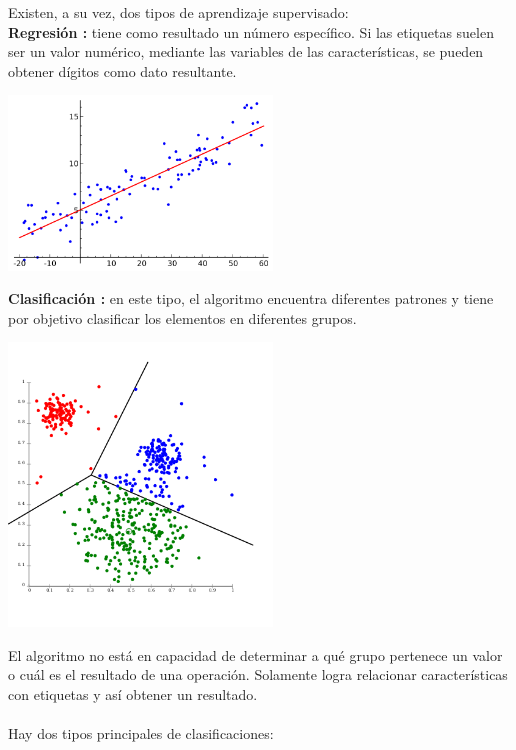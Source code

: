 \documentclass[%
 reprint,
 amsmath,amssymb,
 aps,
]{revtex4-1}
\begin{document}
Existen, a su vez, dos tipos de aprendizaje supervisado:\\
 \textbf{Regresión : }tiene como resultado un número específico. Si las etiquetas suelen ser un valor numérico, mediante las variables de las características, se pueden obtener dígitos como dato resultante.\\
 
 
\begin{center}
\includegraphics[width=7cm]{./Imagenes/regresion}
\end{center}
 
 \textbf{Clasificación : }en este tipo, el algoritmo encuentra diferentes patrones y tiene por objetivo clasificar los elementos en diferentes grupos.\\
 
 \begin{center}
\includegraphics[width=7cm]{./Imagenes/clasificacion}
\end{center}

El algoritmo no está en capacidad de determinar a qué grupo pertenece un valor o cuál es el resultado de una operación. Solamente logra relacionar características con etiquetas y así obtener un resultado.\\\\

Hay dos tipos principales de clasificaciones:\\
\end{document}
